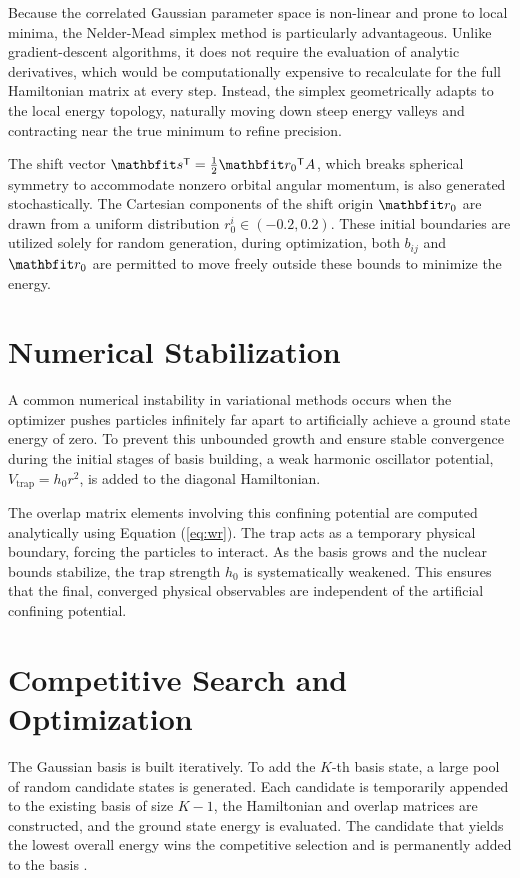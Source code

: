 \documentclass[a4paper,oneside,article,12pt]{memoir}
\begin{document}
Because the correlated Gaussian parameter space is non-linear and prone to local minima, the Nelder-Mead simplex method is particularly advantageous. Unlike gradient-descent algorithms, it does not require the evaluation of analytic derivatives, which would be computationally expensive to recalculate for the full Hamiltonian matrix at every step. Instead, the simplex geometrically adapts to the local energy topology, naturally moving down steep energy valleys and contracting near the true minimum to refine precision.

The shift vector $\v{s}\tr = \frac{1}{2}\v{r}_0\tr A$, which breaks spherical symmetry to accommodate nonzero orbital angular momentum, is also generated stochastically. The Cartesian components of the shift origin $\v{r}_0$ are drawn from a uniform distribution $r_0^i \in (-0.2, 0.2)$. These initial boundaries are utilized solely for random generation, during optimization, both $b_{ij}$ and $\v{r}_0$ are permitted to move freely outside these bounds to minimize the energy.

\section{Numerical Stabilization}
A common numerical instability in variational methods occurs when the optimizer pushes particles infinitely far apart to artificially achieve a ground state energy of zero. To prevent this unbounded growth and ensure stable convergence during the initial stages of basis building, a weak harmonic oscillator potential, $V_{\text{trap}} = h_0 r^2$, is added to the diagonal Hamiltonian. 

The overlap matrix elements involving this confining potential are computed analytically using Equation (\ref{eq:wr}). The trap acts as a temporary physical boundary, forcing the particles to interact. As the basis grows and the nuclear bounds stabilize, the trap strength $h_0$ is systematically weakened. This ensures that the final, converged physical observables are independent of the artificial confining potential.

\section{Competitive Search and Optimization}
The Gaussian basis is built iteratively. To add the $K$-th basis state, a large pool of random candidate states is generated. Each candidate is temporarily appended to the existing basis of size $K-1$, the Hamiltonian and overlap matrices are constructed, and the ground state energy is evaluated. The candidate that yields the lowest overall energy wins the competitive selection and is permanently added to the basis \cite{SVM}.
\end{document}
